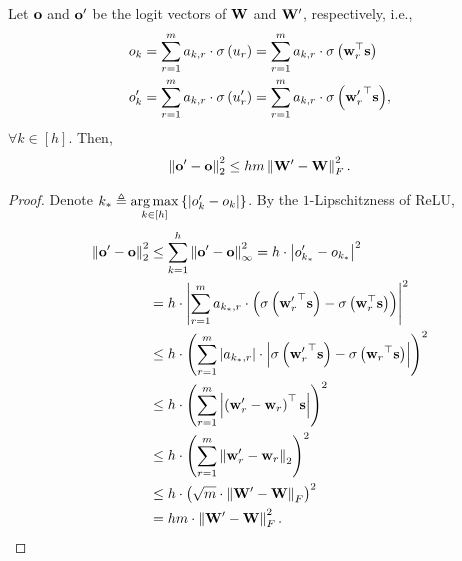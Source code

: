 \begin{lem}
\label{lem:logit_upper_bound_parameter}
Let ${\mathbf{o}}$ and ${\mathbf{o}}^\prime$ be the logit vectors of  ${\mathbf{W}}$ and ${\mathbf{W}}^\prime$, respectively, i.e.,
\begin{equation*}
\begin{split}
    &o_{k} = \sum\limits_{r=1}^{m}{ a_{k,r} \cdot \sigma\left( u_{r} \right)} = \sum\limits_{r=1}^{m}{ a_{k,r} \cdot \sigma\left({\mathbf{w}}_r^\top {\mathbf{s}} \right)} \\
    &o_{k}^\prime = \sum\limits_{r=1}^{m}{ a_{k,r} \cdot \sigma\left( u_{r}^\prime \right)} = \sum\limits_{r=1}^{m}{ a_{k,r} \cdot \sigma\left({{\mathbf{w}}_r^\prime}^\top {\mathbf{s}} \right)},
\end{split}
\end{equation*}
$\forall k \in [h]$. Then,
\begin{equation*}
\begin{split}
    \left\| {\mathbf{o}}^\prime - {\mathbf{o}} \right\|_2^2 \le h m \left\| {\mathbf{W}}^\prime - {\mathbf{W}} \right\|_F^2.
\end{split}
\end{equation*}
\end{lem}
\begin{proof}
Denote $k_* \triangleq \operatorname*{arg\,max}\limits_{k \in [h]}\left\{ \left| o_{k}^\prime - o_{k} \right| \right\}$. By the $1$-Lipschitzness of ReLU,
\begin{equation*}
\begin{split}
    \left\| {\mathbf{o}}^\prime - {\mathbf{o}} \right\|_2^2 &\le \sum\limits_{k = 1}^{h}{ \left\| {\mathbf{o}}^\prime - {\mathbf{o}} \right\|_\infty^2} = h \cdot \left| o_{k_*}^\prime - o_{k_*} \right|^2 \\
    &= h \cdot \left| \sum\limits_{r=1}^{m}{ a_{k_*,r} \cdot \left( \sigma\left({{\mathbf{w}}_r^\prime}^\top {\mathbf{s}} \right) - \sigma\left({\mathbf{w}}_r^\top {\mathbf{s}} \right) \right)} \right|^2 \\
    &\le h \cdot \left( \sum\limits_{r=1}^{m}{ \left| a_{k_*,r} \right| \cdot \left| \sigma\left({{\mathbf{w}}_r^\prime}^\top {\mathbf{s}}\right) - \sigma\left({{\mathbf{w}}_r}^\top {\mathbf{s}}\right) \right|  } \right)^2 \\
    &\le h \cdot \left( \sum\limits_{r=1}^{m}{ \left| \left({{\mathbf{w}}_r^\prime} - {\mathbf{w}}_r \right)^\top {\mathbf{s}}\right|  } \right)^2 \\
    &\le h \cdot \left( \sum\limits_{r=1}^{m}{ \left\| {{\mathbf{w}}_r^\prime} - {\mathbf{w}}_r \right\|_2  } \right)^2 \\
    &\le h \cdot \left( \sqrt{m} \cdot \left\| {\mathbf{W}}^\prime - {\mathbf{W}} \right\|_F \right)^2 \\
    &= h m \cdot \left\| {\mathbf{W}}^\prime - {\mathbf{W}} \right\|_F^2. \qedhere
\end{split}
\end{equation*}
\end{proof}

